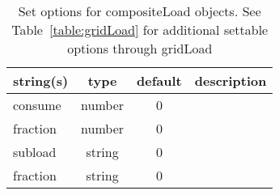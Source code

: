\begin{table}[ht]
\centering
\begin{tabular}{p{5cm} c c p{7cm}}
\hline
string(s) & type & default & description \\
\hline
consume & number & 0 & \\
fraction & number & 0 & \\
subload & string & 0 & \\
fraction & string & 0 & \\
\hline
\end{tabular}
\caption{Set options for compositeLoad objects. See Table~\ref{table:gridLoad} for additional settable options through gridLoad}
\label{table:compositeLoad}
\end{table}
